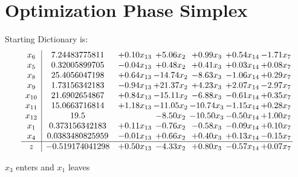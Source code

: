 \documentclass[9pt]{article}
\begin{document}
\section{Optimization Phase Simplex}
Starting Dictionary is:
\[\begin{array}{c| c c@{\hskip 2pt} c@{\hskip 2pt} c@{\hskip 2pt} c@{\hskip 2pt} c@{\hskip 2pt} }
 x_{6}   &  7.24483775811 & +  0.10 x_{13} & +  5.06 x_{2} & +  0.99 x_{3} & +  0.54 x_{14} & -1.71 x_{7}\\
 x_{5}   &  0.32005899705 & -0.04 x_{13} & +  0.48 x_{2} & +  0.41 x_{3} & +  0.03 x_{14} & +  0.08 x_{7}\\
 x_{8}   &  25.4056047198 & +  0.64 x_{13} & -14.74 x_{2} & -8.63 x_{3} & -1.06 x_{14} & +  0.29 x_{7}\\
 x_{9}   &  1.73156342183 & -0.94 x_{13} & + 21.37 x_{2} & +  4.23 x_{3} & +  2.07 x_{14} & -2.97 x_{7}\\
 x_{10}   &  21.6902654867 & +  0.84 x_{13} & -15.11 x_{2} & -6.88 x_{3} & -0.61 x_{14} & +  0.35 x_{7}\\
 x_{11}   &  15.0663716814 & +  1.18 x_{13} & -11.05 x_{2} & -10.74 x_{3} & -1.15 x_{14} & +  0.28 x_{7}\\
 x_{12}   &  19.5  &   & -8.50 x_{2} & -10.50 x_{3} & -0.50 x_{14} & +  1.00 x_{7}\\
 x_{1}   &  0.373156342183 & +  0.11 x_{13} & -0.76 x_{2} & -0.58 x_{3} & -0.09 x_{14} & +  0.10 x_{7}\\
 x_{4}   &  0.0383480825959 & -0.01 x_{13} & +  0.66 x_{2} & +  0.40 x_{3} & +  0.13 x_{14} & -0.15 x_{7}\\
\hline
z    &  -0.519174041298 & +  0.50 x_{13} & -4.33 x_{2} & +  0.80 x_{3} & -0.57 x_{14} & +  0.07 x_{7}\\
\end{array}\]


 $ x_{3} $ enters and $ x_{1} $ leaves 
\end{document}
